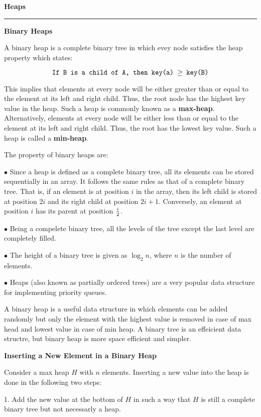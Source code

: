 {\bf Heaps}
\vskip 1mm
\hrule

\vskip 3mm
{\bf Binary Heaps}

\vskip 1mm
A binary heap is a complete binary tree in which evey node satisfies the heap property which states:

$$\hbox{\tt If B is a child of A, then key(a) $\geq$ key(B)}$$

This implies that elements at every node will be either greater than or equal to the element at its left and right child. Thus, the root node has the highest key value in the heap. Such a heap is commonly known as a {\bf max-heap}. Alternatively, elements at every node will be either less than or equal to the element at its left and right child. Thus, the root has the lowest key value. Such a heap is called a {\bf min-heap}.

\vskip 1mm
The property of binary heaps are:

\vskip 2mm
\qquad$\bullet$ Since a heap is defined as a complete binary tree, all its elements can be stored sequentially in an array. It follows the same rules as that of a complete binary tree. That is, if an element is at position $i$ in the array, then its left child is stored at position $2i$ and its right child at position $2i+1$. Conversely, an element at position $i$ has its parent at position ${i\over 2}$.

\vskip 3mm
\qquad$\bullet$ Being a compelete binary tree, all the levels of the tree except the last level are completely filled.

\vskip 3mm
\qquad$\bullet$ The height of a binary tree is given as $\log_2 n$, where $n$ is the number of elements.

\vskip 3mm
\qquad$\bullet$ Heaps (also known as partially ordered trees) are a very popular data structure for implementing priority queues.

\vskip 1mm
A binary heap is a useful data structure in which elements can be added randomly but only the element with the highest value is removed in case of max head and lowest value in case of min heap. A binary tree is an effeicient data structre, but  binary heap is more space efficient and simpler.

\filbreak
\vskip 1cm
{\bf Inserting a New Element in a Binary Heap}

\vskip 1mm
Consider a max heap $H$ with $n$ elements. Inserting a new value into the heap is done in the following two steps:

\vskip 2mm
1. Add the new value at the bottom of $H$ in such a way that $H$ is still a complete binary tree but not necessarly a heap.

